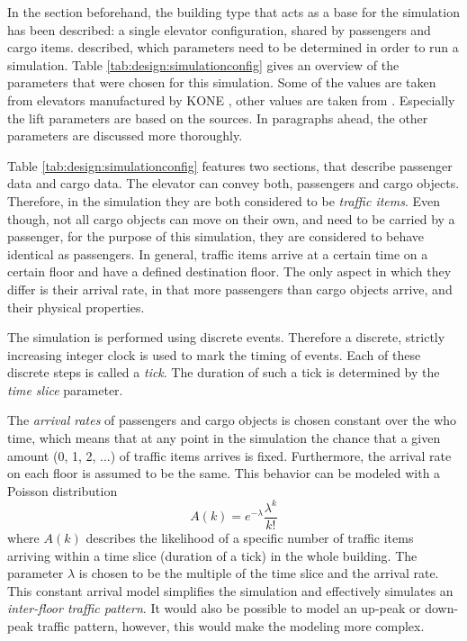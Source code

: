 In the section beforehand, the building type that acts as a base for the simulation has been described:
a single elevator configuration, shared by passengers and cargo items.
\textcite[][p.~347]{barney2016handbook} described, which parameters need to be determined in order to run a simulation. 
Table \ref{tab:design:simulationconfig} gives an overview of the parameters that were chosen for this simulation.
Some of the values are taken from elevators manufactured by KONE \autocite[][]{kone2017overview}, 
other values are taken from \textcite[][p.~349]{barney2016handbook}.
Especially the lift parameters are based on the sources.
In paragraphs ahead, the other parameters are discussed more thoroughly.

Table \ref{tab:design:simulationconfig} features two sections, that describe passenger data and cargo data.
The elevator can convey both, passengers and cargo objects.
Therefore, in the simulation they are both considered to be \emph{traffic items}.
Even though, not all cargo objects can move on their own, and need to be carried by a passenger,
for the purpose of this simulation, they are considered to behave identical as passengers.
In general, traffic items arrive at a certain time on a certain floor and have a defined destination floor.
The only aspect in which they differ is their arrival rate, in that more passengers than cargo objects arrive, and their physical properties.

The simulation is performed using discrete events.
Therefore a discrete, strictly increasing integer clock is used to mark the timing of events.
Each of these discrete steps is called a \emph{tick}.
The duration of such a tick is determined by the \emph{time slice} parameter.

The \emph{arrival rates} of passengers and cargo objects is chosen constant over the who time, 
which means that at any point in the simulation the chance that a given amount (0, 1, 2, ...) of traffic items arrives is fixed.
Furthermore, the arrival rate on each floor is assumed to be the same.
This behavior can be modeled with a Poisson distribution
$$ A(k) = e^{-\lambda}\frac{\lambda^k}{k!} $$
where $ A(k) $ describes the likelihood of a specific number of traffic items arriving within a time slice (duration of a tick) in the whole building.
The parameter $ \lambda $ is chosen to be the multiple of the time slice and the arrival rate.
This constant arrival model simplifies the simulation and effectively simulates an \emph{inter-floor traffic pattern}.
It would also be possible to model an up-peak or down-peak traffic pattern, however, this would make the modeling more complex.

